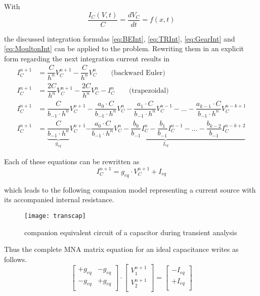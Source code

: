 With
\begin{equation}
\dfrac{I_C(V, t)}{C} = \dfrac{d V_C}{d t} = f(x,t)
\end{equation}

the discussed integration formulas \eqref{eq:BEInt}, \eqref{eq:TRInt},
\eqref{eq:GearInt} and \eqref{eq:MoultonInt} can be applied to the
problem.  Rewriting them in an explicit form regarding the next
integration current results in
\begin{align}
\label{eq:EulerIC}
I_C^{n+1} &= \dfrac{C}{h^{n}} V_C^{n+1} - \dfrac{C}{h^{n}} V_C^{n} \qquad\text{(backward Euler)}\\
I_C^{n+1} &= \dfrac{2C}{h^{n}} V_C^{n+1} - \dfrac{2C}{h^{n}} V_C^{n} - I_C^n \qquad\text{(trapezoidal)}\\
I_C^{n+1} &= \dfrac{C}{b_{-1}\cdot h^{n}} V_C^{n+1} - \dfrac{a_0\cdot C}{b_{-1}\cdot h^{n}} V_C^{n} - \dfrac{a_1\cdot C}{b_{-1}\cdot h^{n}} V_C^{n-1} - \ldots - \dfrac{a_{k-1}\cdot C}{b_{-1}\cdot h^{n}} V_C^{n-k+1}\\
I_C^{n+1} &= \underbrace{\dfrac{C}{b_{-1}\cdot h^{n}}}_{g_{eq}} V_C^{n+1} \underbrace{- \dfrac{a_0\cdot C}{b_{-1}\cdot h^{n}} V_C^{n} - \dfrac{b_0}{b_{-1}} I_C^n - \dfrac{b_1}{b_{-1}} I_C^{n-1} - \ldots - \dfrac{b_{k-2}}{b_{-1}} I_C^{n-k+2}}_{I_{eq}}
\end{align}

Each of these equations can be rewritten as
\begin{equation}
I_C^{n+1} = g_{eq}\cdot V_C^{n+1} + I_{eq}
\end{equation}

which leads to the following companion model representing a current
source with its accompanied internal resistance.
\begin{figure}[ht]
\begin{center}
\texttt{[image: transcap]}
\end{center}
\caption{companion equivalent circuit of a capacitor during transient analysis}
\label{fig:TransCap}
\end{figure}
\FloatBarrier

Thus the complete MNA matrix equation for an ideal capacitance writes
as follows.
\begin{equation}
\begin{bmatrix}
+g_{eq} & -g_{eq}\\
-g_{eq} & +g_{eq}\\
\end{bmatrix}
\cdot
\begin{bmatrix}
V_1^{n+1}\\
V_2^{n+1}\\
\end{bmatrix}
=
\begin{bmatrix}
-I_{eq}\\
+I_{eq}\\
\end{bmatrix}
\end{equation}

